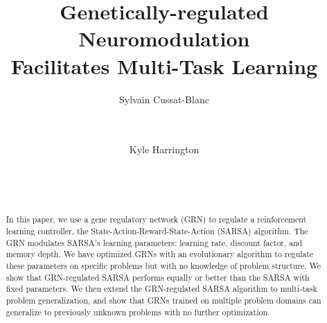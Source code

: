 \documentclass{sig-alternate-2}
\title{Genetically-regulated Neuromodulation\\
    Facilitates Multi-Task Learning}
\author{
\alignauthor
Sylvain Cussat-Blanc\\
\affaddr{University of Toulouse}\\
\affaddr{21 All\'ee de Brienne} \\
\affaddr{31042 Toulouse, France}
\email{cussat@irit.fr}
\and
\alignauthor
Kyle Harrington\\
\affaddr{Beth Israel Deaconess Medical Center}\\
\affaddr{Harvard Medical School}\\
\affaddr{02215 Boston, MA} \\
\email{kharrin3@bidmc.harvard.edu}
}
\date{}
\begin{document}
\maketitle

\begin{abstract}
In this paper, we use a gene regulatory network (GRN) to regulate a reinforcement learning controller, the State-Action-Reward-State-Action (SARSA) algorithm. The GRN modulates SARSA's learning parameters: learning rate, discount factor, and memory depth. We have optimized GRNs with an evolutionary algorithm to regulate these parameters on specific problems but with no knowledge of problem structure. We show that GRN-regulated SARSA performs equally or better than the SARSA with fixed parameters. We then extend the GRN-regulated SARSA algorithm to multi-task problem generalization, and show that GRNs trained on multiple problem domains can generalize to previously unknown problems with no further optimization. 
\end{abstract}
















\end{document}
